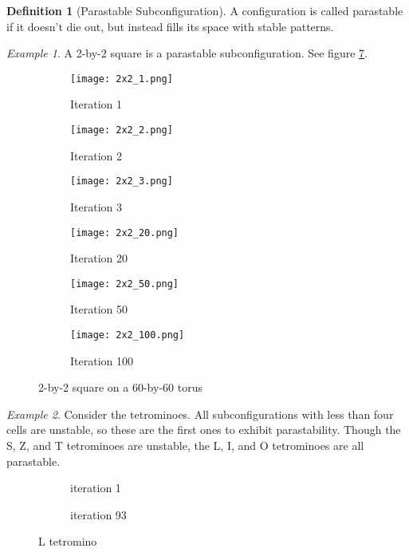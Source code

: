 \documentclass[12pt]{article}
\theoremstyle{definition}
\newtheorem{definition}{Definition}%
\theoremstyle{remark}
\theoremstyle{remark}
\newtheorem{example}{Example}%
\begin{document}
\begin{definition}[Parastable Subconfiguration]
A configuration is called parastable if it doesn't die out, but instead fills its space with stable patterns.
\end{definition}
\begin{example}
A 2-by-2 square is a parastable subconfiguration. See figure \ref{ParastableFig}.

\begin{figure}[H]
  \centering
  \begin{subfigure}[b]{0.25\linewidth}
    \texttt{[image: 2x2\_1.png]}
    \caption{Iteration 1}
    \label{fig:2x2_1}
  \end{subfigure}
  \begin{subfigure}[b]{0.25\linewidth}
    \texttt{[image: 2x2\_2.png]}
    \caption{Iteration 2}
    \label{fig23x2_2}
  \end{subfigure}
  \begin{subfigure}[b]{0.25\linewidth}
    \texttt{[image: 2x2\_3.png]}
    \caption{Iteration 3}
    \label{fig:2x2_3}
  \end{subfigure}
  \begin{subfigure}[b]{0.25\linewidth}
    \texttt{[image: 2x2\_20.png]}
    \caption{Iteration 20}
    \label{fig:2x2_20}
  \end{subfigure}
  \begin{subfigure}[b]{0.25\linewidth}
    \texttt{[image: 2x2\_50.png]}
    \caption{Iteration 50}
    \label{fig:2x2_50}
  \end{subfigure}
  \begin{subfigure}[b]{0.25\linewidth}
    \texttt{[image: 2x2\_100.png]}
    \caption{Iteration 100}
    \label{fig:2x2_100}
  \end{subfigure}
  \caption{2-by-2 square on a 60-by-60 torus}
  \label{ParastableFig}
\end{figure} 

\end{example}
\begin{example}
Consider the tetrominoes. All subconfigurations with less than four cells are unstable, so these are the first ones to exhibit parastability. Though the S, Z, and T tetrominoes are unstable, the L, I, and O tetrominoes are all parastable. %
\begin{figure}[H]
  \centering
  \begin{subfigure}[b]{0.4\linewidth}
    \caption{iteration 1}
  \end{subfigure}
  \begin{subfigure}[b]{0.4\linewidth}
    \caption{iteration 93}
  \end{subfigure}
  \caption{L tetromino}
\end{figure}
\end{example}
\end{document}
